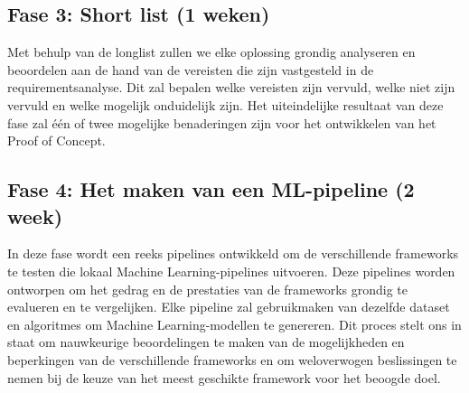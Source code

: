 \subsection{Fase 3: Short list (1 weken)}
Met behulp van de longlist zullen we elke oplossing grondig analyseren en beoordelen aan de hand van de vereisten die zijn vastgesteld in de requirementsanalyse. Dit zal bepalen welke vereisten zijn vervuld, welke niet zijn vervuld en welke mogelijk onduidelijk zijn. Het uiteindelijke resultaat van deze fase zal één of twee mogelijke benaderingen zijn voor het ontwikkelen van het Proof of Concept.
\subsection{Fase 4: Het maken van een ML-pipeline (2 week)}
In deze fase wordt een reeks pipelines ontwikkeld om de verschillende frameworks te testen die lokaal Machine Learning-pipelines uitvoeren. Deze pipelines worden ontworpen om het gedrag en de prestaties van de frameworks grondig te evalueren en te vergelijken. Elke pipeline zal gebruikmaken van dezelfde dataset en algoritmes om Machine Learning-modellen te genereren. Dit proces stelt ons in staat om nauwkeurige beoordelingen te maken van de mogelijkheden en beperkingen van de verschillende frameworks en om weloverwogen beslissingen te nemen bij de keuze van het meest geschikte framework voor het beoogde doel.
